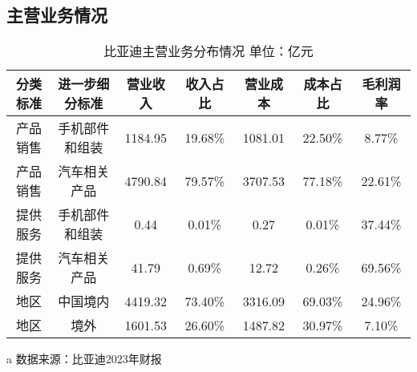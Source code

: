 \subsection{主营业务情况}
\begin{table}
  \centering
  \begin{threeparttable}[c]
    \caption{比亚迪主营业务分布情况   单位：亿元}
    \label{tab:main-income}
    \begin{tabular}{ccccccc}
      \toprule
        分类标准 & 进一步细分标准 & 营业收入 & 收入占比 & 营业成本 & 成本占比 & 毛利润率 \\ 
      \midrule
        产品销售 & 手机部件和组装 & 1184.95  & 19.68\% & 1081.01  & 22.50\% & 8.77\% \\ 
        产品销售 & 汽车相关产品 & 4790.84  & 79.57\% & 3707.53  & 77.18\% & 22.61\% \\ 
        提供服务 & 手机部件和组装 & 0.44  & 0.01\% & 0.27  & 0.01\% & 37.44\% \\ 
        提供服务 & 汽车相关产品 & 41.79  & 0.69\% & 12.72  & 0.26\% & 69.56\% \\ 
        地区 & 中国境内 & 4419.32  & 73.40\% & 3316.09  & 69.03\% & 24.96\% \\ 
        地区 & 境外 & 1601.53  & 26.60\% & 1487.82  & 30.97\% & 7.10\% \\ 
      \bottomrule
    \end{tabular}
    \begin{tablenotes}
      \item [a] 数据来源：比亚迪2023年财报
    \end{tablenotes}
  \end{threeparttable}
\end{table}


